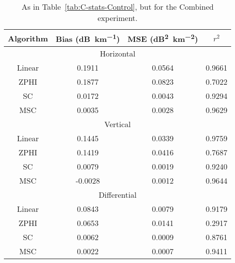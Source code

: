 \begin{table}
    \centering
    \begin{tabular}{| c | c | c | c |}
        \hline
        Algorithm & Bias (\si{dB\per \kilo\meter}) & MSE (\si{dB\squared \per \kilo\meter \squared}) & $r^2$ \\
        \hline
        \hline
        \multicolumn{4}{|c|}{Horizontal}\\
        \hline
        Linear & 0.1911 & 0.0564 & 0.9661\\
        ZPHI & 0.1877 & 0.0823 & 0.7022\\
        SC & 0.0172 & 0.0043 & 0.9294\\
        MSC & 0.0035 & 0.0028 & 0.9629\\
        \hline
        \multicolumn{4}{|c|}{Vertical}\\
        \hline
        Linear & 0.1445 & 0.0339 & 0.9759\\
        ZPHI & 0.1419 & 0.0416 & 0.7687\\
        SC & 0.0079 & 0.0019 & 0.9240\\
        MSC & -0.0028 & 0.0012 & 0.9644\\
        \hline
        \multicolumn{4}{|c|}{Differential}\\
        \hline
        Linear & 0.0843 & 0.0079 & 0.9179\\
        ZPHI & 0.0653 & 0.0141 & 0.2917\\
        SC & 0.0062 & 0.0009 & 0.8761\\
        MSC & 0.0022 & 0.0007 & 0.9411\\
\hline
    \end{tabular}
    \caption{As in Table~\ref{tab:C-stats-Control}, but for
    the Combined experiment.}
    \label{tab:C-stats-Combined}
\end{table}
